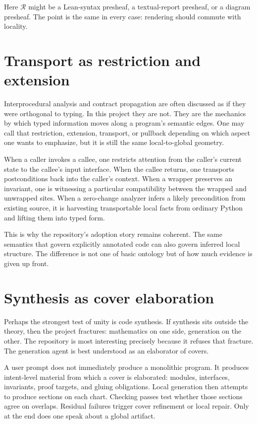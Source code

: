 Here \(\mathcal{R}\) might be a Lean-syntax presheaf, a textual-report presheaf, or a diagram
presheaf. The point is the same in every case: rendering should commute with locality.

\section*{Transport as restriction and extension}
Interprocedural analysis and contract propagation are often discussed as if they were
orthogonal to typing. In this project they are not. They are the mechanics by which typed
information moves along a program's semantic edges. One may call that restriction,
extension, transport, or pullback depending on which aspect one wants to emphasize, but it
is still the same local-to-global geometry.

When a caller invokes a callee, one restricts attention from the caller's current state to
the callee's input interface. When the callee returns, one transports postconditions back
into the caller's context. When a wrapper preserves an invariant, one is witnessing a
particular compatibility between the wrapped and unwrapped sites. When a zero-change analyzer
infers a likely precondition from existing source, it is harvesting transportable local
facts from ordinary Python and lifting them into typed form.

This is why the repository's adoption story remains coherent. The same semantics that govern
explicitly annotated code can also govern inferred local structure. The difference is not one
of basic ontology but of how much evidence is given up front.

\section*{Synthesis as cover elaboration}
Perhaps the strongest test of unity is code synthesis. If synthesis sits outside the theory,
then the project fractures: mathematics on one side, generation on the other. The repository
is most interesting precisely because it refuses that fracture. The generation agent is best
understood as an elaborator of covers.

A user prompt does not immediately produce a monolithic program. It produces intent-level
material from which a cover is elaborated: modules, interfaces, invariants, proof targets,
and gluing obligations. Local generation then attempts to produce sections on each chart.
Checking passes test whether those sections agree on overlaps. Residual failures trigger
cover refinement or local repair. Only at the end does one speak about a global artifact.

